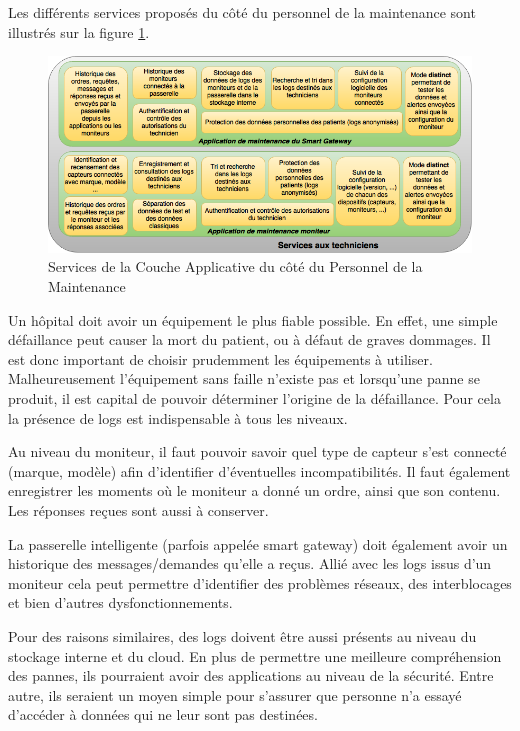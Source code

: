 Les différents services proposés du côté du personnel de la maintenance sont illustrés sur la figure \ref{maintenance}.
\newline
\begin{figure}[h!]
	\hspace*{-2.5cm}
	\centering
	\includegraphics[width=1.4\textwidth]{maintenance.png}
	\caption{Services de la Couche Applicative du côté du Personnel de la Maintenance}
	\label{maintenance}
\end{figure}

Un hôpital doit avoir un équipement le plus fiable possible. En effet, une simple défaillance peut causer la mort du patient, ou
à défaut de graves dommages. Il est donc important de choisir prudemment les équipements à utiliser. Malheureusement l'équipement
sans faille n'existe pas et lorsqu'une panne se produit, il est capital de pouvoir déterminer l'origine de la défaillance. Pour
cela la présence de logs est indispensable à tous les niveaux. 
\newline

Au niveau du moniteur, il faut pouvoir savoir quel type de capteur s'est connecté (marque, modèle) afin d'identifier d'éventuelles
incompatibilités. Il faut également enregistrer les moments où le moniteur a donné un ordre, ainsi que son contenu.
Les réponses reçues sont aussi à conserver.
\newline

La passerelle intelligente (parfois appelée smart gateway) doit également avoir un historique des messages/demandes qu'elle a
reçus. Allié avec les logs issus d'un moniteur cela peut permettre d'identifier des problèmes réseaux, des interblocages et bien
d'autres dysfonctionnements.
\newline 

Pour des raisons similaires, des logs doivent être aussi présents au niveau du stockage interne et du cloud. En plus de permettre
une meilleure compréhension des pannes, ils pourraient avoir des applications au niveau de la sécurité. Entre autre, ils seraient
un moyen simple pour s'assurer que personne n'a essayé d'accéder à données qui ne leur sont pas destinées.
\newline

